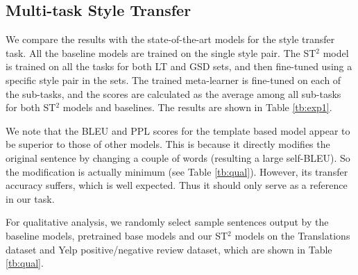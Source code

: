 \subsection{Multi-task Style Transfer}
\label{sec:st}

We compare the results with the state-of-the-art models for the style transfer task. All the baseline models are trained on the single style pair. The ST$^2$ model is trained on all the tasks for both LT and GSD sets, and then fine-tuned using a specific style pair in the sets. The trained meta-learner is fine-tuned on each of the sub-tasks, and the scores are calculated as the average among all sub-tasks for both ST$^2$ models and baselines. The results are shown in Table \ref{tb:exp1}. 

We note that the BLEU and PPL scores for the template based model appear
to be superior to those of other models. This is because it directly 
modifies the original sentence by changing a couple of words (resulting a large self-BLEU). So the modification
is actually minimum (see Table \ref{tb:qual}). However, its transfer accuracy suffers, which is
well expected. Thus it should only serve as a reference in our task.

For qualitative analysis, we randomly select sample sentences output 
by the baseline models, pretrained base models and our ST$^2$ models 
on the Translations dataset and Yelp positive/negative review dataset, 
which are shown in Table \ref{tb:qual}.

